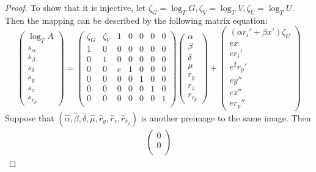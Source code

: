 \documentclass{article}
\theoremstyle{definition}
\newcommand{\wh}[1]{\widehat{#1}}
\begin{document}
\begin{proof}
	To show that it is injective, let $\zeta_G = \log_T G, \zeta_V = \log_T V, \zeta_U = \log_T U$.
	Then the mapping can be described by the following matrix equation:
	\begin{equation*}
		\begin{pmatrix}
			\log_T A \\
			s_\alpha \\
			s_\beta \\
			s_\delta \\
			s_y \\
			s_z \\
			s_{r_p}
		\end{pmatrix}
		=
		\begin{pmatrix}
			\zeta_G & \zeta_V & 1 & 0 & 0 & 0 & 0 \\
			1 & 0 & 0 & 0 & 0 & 0 & 0 \\
			0 & 1 & 0 & 0 & 0 & 0 & 0 \\
			0 & 0 & e & 1 & 0 & 0 & 0 \\
			0 & 0 & 0 & 0 & 1 & 0 & 0 \\
			0 & 0 & 0 & 0 & 0 & 1 & 0 \\
			0 & 0 & 0 & 0 & 0 & 0 & 1 \\
		\end{pmatrix}
		\begin{pmatrix}
			\alpha \\
			\beta \\
			\delta \\
			\mu \\
			r_y \\
			r_z \\
			r_{r_p}
		\end{pmatrix}
		+
		\begin{pmatrix}
			(\alpha r_i' + \beta x') \zeta_U \\
			e x \\
			e r_i' \\
			e^2 r_p' \\
			e y'' \\
			e z'' \\
			e r_p''
		\end{pmatrix}
	\end{equation*}
	Suppose that $(\wh{\alpha}, \wh{\beta}, \wh{\delta}, \wh{\mu}, \wh{r}_y, \wh{r}_z, \wh{r}_{r_p})$ is another preimage to the same image.
	Then
	\begin{multline*}
		\begin{pmatrix}
			0 \\
			0 \\

\end{pmatrix}
\end{multline*}
\end{proof}
\end{document}
